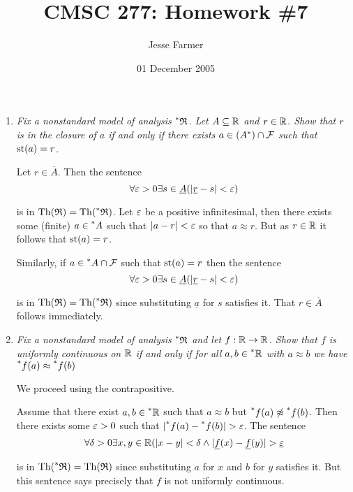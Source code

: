 \documentclass[10pt]{article}
\title{CMSC 277: Homework \#7}
\author{Jesse Farmer}
\date{01 December 2005}
\begin{document}
\maketitle

\begin{enumerate}
\item \emph{Fix a nonstandard model of analysis $\leftexp{\ast}{\mathfrak{R}}$.  Let $A \subseteq \R$ and $r \in \R$.  Show that $r$ is in the closure of $a$ if and only if there exists $a \in (A^\ast) \cap \cal{F}$ such that $\st(a) = r$.}

Let $r \in \overline{A}$.  Then the sentence
\[
\forall \e > 0 \exists s \in \underline{A} (\abs{\underline{r} - s} < \e)
\]

is in $\Th(\mathfrak{R}) = \Th(\leftexp{\ast}{\mathfrak{R}})$.  Let $\e$ be a positive infinitesimal, then there exists some (finite) $a \in \leftexp{\ast}{A}$ such that $|a-r| < \e$ so that $a \approx r$.  But as $r \in \R$ it follows that $\st(a) = r$.

Similarly, if $a \in \leftexp{\ast}{A} \cap \cal{F}$ such that $\st(a) = r$ then the sentence
\[
\forall \e > 0 \exists s \in \underline{A} (\abs{\underline{r} - s} < \e)
\]

is in $\Th(\mathfrak{R}) = \Th(\leftexp{\ast}{\mathfrak{R}})$ since substituting $\underline{a}$ for $s$ satisfies it.  That $r \in \overline{A}$ follows immediately.

\item \emph{Fix a nonstandard model of analysis $\leftexp{\ast}{\mathfrak{R}}$ and let $f: \R \to \R$.  Show that $f$ is uniformly continuous on $\R$ if and only if for all $a,b \in \leftexp{\ast}{\R}$ with $a \approx b$ we have $\leftexp{\ast}{f(a)} \approx \leftexp{\ast}{f(b)}$}

We proceed using the contrapositive.




Assume that there exist $a,b \in \leftexp{\ast}{\R}$ such that $a \approx b$ but $\leftexp{\ast}{f(a)} \not\approx \leftexp{\ast}{f(b)}$.  Then there exists some $\e > 0$ such that $|\leftexp{\ast}{f(a)} - \leftexp{\ast}{f(b)}| > \e$.  The sentence
\[
\forall \delta > 0 \exists x,y \in \R (|x-y| < \delta \land |\underline{f}(x) - \underline{f}(y)| > \underline{\e}
\]

is in $\Th(\leftexp{\ast}{\mathfrak{R}}) = \Th(\mathfrak{R})$ since substituting $a$ for $x$ and $b$ for $y$ satisfies it.  But this sentence says precisely that $f$ is not uniformly continuous.


\end{enumerate}
\end{document}
